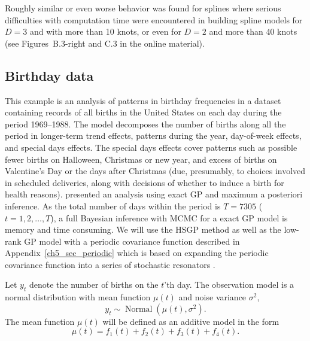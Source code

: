 \documentclass[onecolumn,a4paper,11pt]{article}
\DeclareMathOperator{\Normal}{Normal}
\begin{document}

Roughly similar or even worse behavior was found for splines where serious difficulties with computation time were encountered in building spline models for $D=3$ and with more than 10 knots, or even for $D=2$ and more than 40 knots (see Figures~B.3-right and C.3 in the online material).


\subsection{Birthday data}\label{ch5_sec_birthday}
%
This example is an analysis of patterns in birthday frequencies in a dataset containing records of all births in the United States on each day during the period 1969–1988. The model decomposes the number of births along all the period in longer-term trend effects, patterns during the year, day-of-week effects, and special days effects. The special days effects cover patterns such as possible fewer births on Halloween, Christmas or new year, and excess of births on Valentine’s Day or the days after Christmas (due, presumably, to choices involved in scheduled deliveries, along with decisions of whether to induce a birth for health reasons). \citet{gelman2013bayesian} presented an analysis using exact GP and maximum a posteriori inference. As the total number of days within the period is $T=7305$ ($t=1,2,\dots,T$), a full Bayesian inference with MCMC for a exact GP model is memory and time consuming. We will use the HSGP method as well as the low-rank GP model with a periodic covariance function described in Appendix~\ref{ch5_sec_periodic} which is based on expanding the periodic covariance function into a series of stochastic resonators \citep{solin2014explicit}.

Let $y_t$ denote the number of births on the $t$'th day. The observation model is a normal distribution with mean function $\mu(t)$ and noise variance $\sigma^2$,
%
\begin{equation*}
y_{t} \sim \Normal(\mu(t),\sigma^2).
\end{equation*}
%
The mean function $\mu(t)$ will be defined as an additive model in the form
%
\begin{equation} \label{ch5_eq_mean_brithday}
\mu(t) = f_1(t) + f_2(t) + f_3(t) + f_4(t).
\end{equation}
\end{document}
